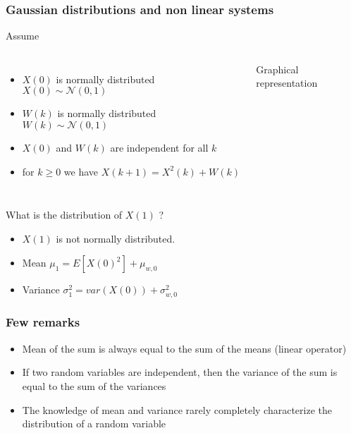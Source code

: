 \begin{frame}
	\frametitle{Gaussian distributions and non linear systems}
	Assume 
	\begin{columns}
		\begin{itemize}
			\item $X(0)$ is normally distributed $X(0)\sim\mathcal{N}(0, 1)$
			\item $W(k)$ is normally distributed $W(k)\sim\mathcal{N}(0, 1)$
			\item $X(0)$ and $W(k)$ are independent for all $k$
			\item for $k\geq0$ we have $X(k+1) =X^2(k) + W(k)$
		\end{itemize}	
		\begin{block}{Graphical representation}
		\end{block}
	\end{columns}
	
	\vspace*{0.5em}
	
	 What is the distribution of $X(1)$ ?
	\begin{itemize}
		\item $X(1)$ is not normally distributed.
		\item Mean $\mu_1=E[X(0)^2]+\mu_{w,0}$
		\item Variance $\sigma_1^2=var(X(0))+\sigma_{w,0}^2$
	\end{itemize}
\end{frame}

\begin{frame}
	\frametitle{Few remarks}
	\begin{itemize}
		\setlength\itemsep{2em}
		\item Mean of the sum is always equal to the sum of the means (linear operator)
		\item If two random variables are independent, then the variance of the sum is equal to the sum of the variances 
		\item The knowledge of mean and variance rarely completely characterize the distribution of a random variable
	\end{itemize}  
\end{frame}


